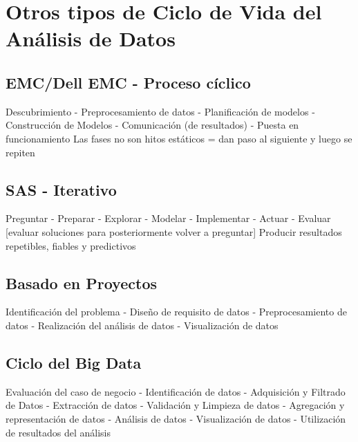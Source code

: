 \section{Otros tipos de Ciclo de Vida del Análisis de Datos}
\subsection{EMC/Dell EMC - Proceso cíclico}
Descubrimiento - Preprocesamiento de datos - Planificación de modelos - Construcción de Modelos - Comunicación (de resultados) - Puesta en funcionamiento
Las fases no son hitos estáticos = dan paso al siguiente y luego se repiten

\subsection{SAS - Iterativo}
Preguntar - Preparar - Explorar - Modelar - Implementar - Actuar - Evaluar [evaluar soluciones para posteriormente volver a preguntar]
Producir resultados repetibles, fiables y predictivos

\subsection{Basado en Proyectos}
Identificación del problema - Diseño de requisito de datos - Preprocesamiento de datos - Realización del análisis de datos - Visualización de datos 

\subsection{Ciclo del Big Data}
Evaluación del caso de negocio - Identificación de datos - Adquisición y Filtrado de Datos - Extracción de datos - Validación y Limpieza de datos - Agregación y representación de datos - Análisis de datos - Visualización de datos - Utilización de resultados del análisis

\newpage